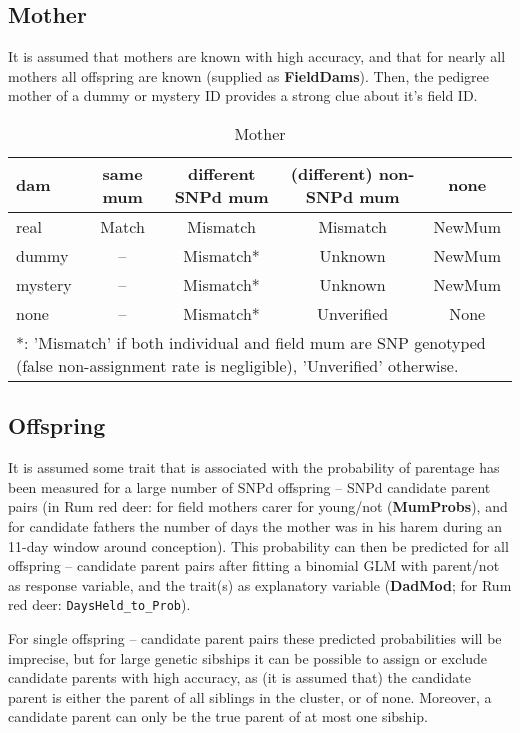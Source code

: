 \documentclass[a4paper, 12pt]{article}
\begin{document}
\subsection{Mother}
It is assumed that mothers are known with high accuracy, and that for nearly all mothers all offspring are known (supplied as {\bfseries FieldDams}). Then, the pedigree mother of a dummy or mystery ID provides a strong clue about it's field ID.

\begin{table}[htbp]
\caption{Mother}
	\centering
		\begin{tabular}{l|cccc}
			\hline
			dam & same mum & different SNPd mum & (different) non-SNPd mum & none \\
			\hline
			real & Match & Mismatch & Mismatch & NewMum \\
			dummy & -- & Mismatch* & Unknown & NewMum \\
			mystery & -- & Mismatch* & Unknown & NewMum \\
			none & -- & Mismatch* & Unverified & None \\
			\hline
			\multicolumn{5}{l}{\parbox{\textwidth}{*: 'Mismatch' if both individual and field mum are SNP genotyped (false non-assignment rate is negligible), 'Unverified' otherwise.}} \\
		\end{tabular}
\end{table}

\subsection{Offspring}
It is assumed some trait that is associated with the probability of parentage has been measured for a large number of SNPd offspring -- SNPd candidate parent pairs (in Rum red deer: for field mothers carer for young/not ({\bfseries MumProbs}), and for candidate fathers the number of days the mother was in his harem during an 11-day window around conception). This probability can then be predicted for all offspring -- candidate parent pairs after fitting a binomial GLM with parent/not as response variable, and the trait(s) as explanatory variable ({\bfseries DadMod}; for Rum red deer: \verb+DaysHeld_to_Prob+).

For single offspring -- candidate parent pairs these predicted probabilities will be imprecise, but for large genetic sibships it can be possible to assign or exclude candidate parents with high accuracy, as (it is assumed that) the candidate parent is either the parent of all siblings in the cluster, or of none. Moreover, a candidate parent can only be the true parent of at most one sibship.
\end{document}
